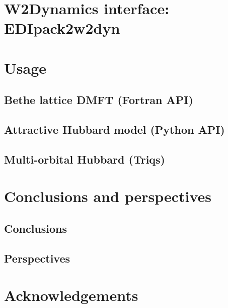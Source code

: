 \documentclass[preprint,3p,10pt]{elsarticle}
\begin{document}
\section{W2Dynamics interface: EDIpack2w2dyn}\label{SecEDI2W2Dyn}



\section{Usage}\label{SecUsage}
\subsection{Bethe lattice DMFT (Fortran API)}
\subsection{Attractive Hubbard model (Python API)}
\subsection{Multi-orbital Hubbard (Triqs)}














\section{Conclusions and perspectives}
\subsection{Conclusions}

\subsection{Perspectives}







\section*{Acknowledgements}





\end{document}
